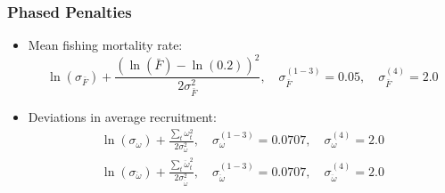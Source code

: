 %
\begin{frame}[c]\frametitle{Phased Penalties}
		\begin{itemize}
			\item<+->  Mean fishing mortality rate:
			\[  \ln(\sigma_{\bar{F}}) + \frac{(\ln(\bar{F})-\ln(0.2))^2}{2\sigma_{\bar{F}}^2},
			\quad \sigma_{\bar{F}}^{(1-3)}=0.05, \quad \sigma_{\bar{F}}^{(4)}=2.0  \]
			
			\item<+-> Deviations in average recruitment:
			\begin{align}
				\ln(\sigma_{\omega}) + \frac{\sum_t\omega_t^2}{2\sigma_{\omega}^2},
				\quad \sigma_{\omega}^{(1-3)}=0.0707, \quad \sigma_{\omega}^{(4)}=2.0 \nonumber\\
				\ln(\sigma_{\ddot{\omega}}) + \frac{\sum_t\ddot{\omega}_t^2}{2\sigma_{\ddot{\omega}}^2},
				\quad \sigma_{\ddot{\omega}}^{(1-3)}=0.0707, \quad \sigma_{\ddot{\omega}}^{(4)}=2.0\nonumber
			\end{align}
		\end{itemize}
\end{frame}
%
